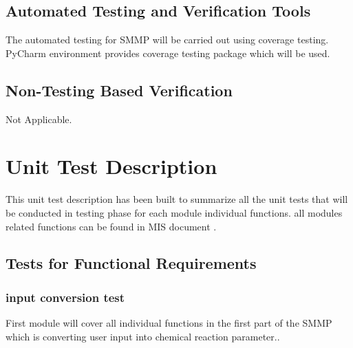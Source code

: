\documentclass[12pt, titlepage]{article}
\begin{document}
\subsection{Automated Testing and Verification Tools}

The automated testing for SMMP will be carried out using coverage testing. PyCharm environment provides coverage testing package which will be used.



\subsection{Non-Testing Based Verification}

Not Applicable. 


\section{Unit Test Description}

This unit test description has been built to summarize all the unit tests that will be conducted in testing phase for each module individual functions. all modules related functions can be found in MIS document .

\subsection{Tests for Functional Requirements}

\subsubsection{input conversion test}

 First module will cover all individual functions in the first part of the SMMP which is converting user input into chemical reaction parameter.. 
\end{document}

